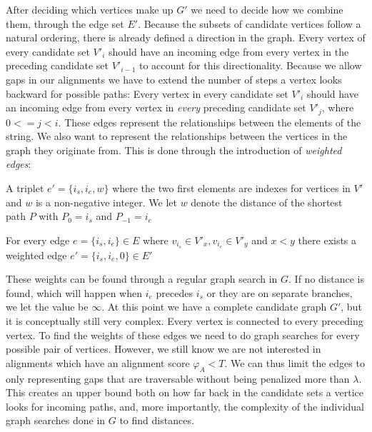 \documentclass[thesis.tex]{subfiles}
\begin{document}
\par\noindent
After deciding which vertices make up $G'$ we need to decide how we combine them, through the edge set $E'$. Because the subsets of candidate vertices follow a natural ordering, there is already defined a direction in the graph. Every vertex of every candidate set $V'_i$ should have an incoming edge from every vertex in the preceding candidate set $V'_{i-1}$ to account for this directionality. Because we allow gaps in our alignments we have to extend the number of steps a vertex looks backward for possible paths: Every vertex in every candidate set $V'_i$ should have an incoming edge from every vertex in \textit{every} preceding candidate set $V'_{j}$, where $0<=j<i$. These edges represent the relationships between the elements of the string. We also want to represent the relationships between the vertices in the graph they originate from. This is done through the introduction of \textit{weighted edges}:
\begin{defn}
  A triplet $e'=\{i_s, i_e, w\}$ where the two first elements are indexes for vertices in $V'$ and $w$ is a non-negative integer. We let $w$ denote the distance of the shortest path $P$ with $P_0=i_s$ and $P_{-1}=i_e$
\end{defn}
\begin{corollary}
  For every edge $e=\{i_s, i_e\} \in E$ where $v_{i_s} \in V'_x, v_{i_e} \in V'_y$ and $x<y$ there exists a weighted edge $e'=\{i_s, i_e, 0\} \in E'$
\end{corollary}
\noindent
These weights can be found through a regular graph search in $G$. If no distance is found, which will happen when $i_e$ precedes $i_s$ or they are on separate branches, we let the value be $\infty$. At this point we have a complete candidate graph $G'$, but it is conceptually still very complex. Every vertex is connected to every preceding vertex. To find the weights of these edges we need to do graph searches for every possible pair of vertices. However, we still know we are not interested in alignments which have an alignment score $\varphi_A < T$. We can thus limit the edges to only representing gaps that are traversable without being penalized more than $\lambda$. This creates an upper bound both on how far back in the candidate sets a vertice looks for incoming paths, and, more importantly, the complexity of the individual graph searches done in $G$ to find distances.
\end{document}
